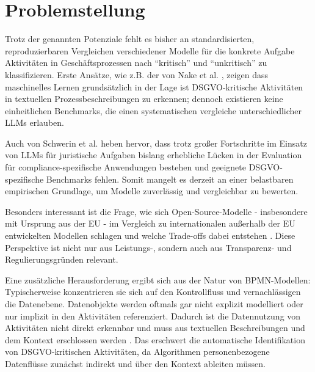 \section{Problemstellung}\label{sec:problemstellung}

Trotz der genannten Potenziale fehlt es bisher an standardisierten, reproduzierbaren Vergleichen verschiedener Modelle für die konkrete Aufgabe Aktivitäten in Geschäftsprozessen nach \enquote{kritisch} und \enquote{unkritisch} zu klassifizieren. Erste Ansätze, wie z.B. der von Nake et al. \cite{nake2023towards}, zeigen dass maschinelles Lernen grundsätzlich in der Lage ist \ac{DSGVO}-kritische Aktivitäten in textuellen Prozessbeschreibungen zu erkennen; dennoch existieren keine einheitlichen Benchmarks, die einen systematischen vergleiche unterschiedlicher \acp{LLM} erlauben.

Auch von Schwerin et al. \cite{schwerin2024systematic} heben hervor, dass trotz großer Fortschritte im Einsatz von \acp{LLM} für juristische Aufgaben bislang erhebliche Lücken in der Evaluation für compliance-spezifische Anwendungen bestehen und geeignete \ac{DSGVO}-spezifische Benchmarks fehlen. Somit mangelt es derzeit an einer belastbaren empirischen Grundlage, um Modelle zuverlässig und vergleichbar zu bewerten.

Besonders interessant ist die Frage, wie sich Open-Source-Modelle - insbesondere mit Ursprung aus der \ac{EU} - im Vergleich zu internationalen außerhalb der \ac{EU} entwickelten Modellen schlagen und welche Trade-offs dabei entstehen \cite{schwerin2024systematic}. Diese Perspektive ist nicht nur aus Leistungs-, sondern auch aus Transparenz- und Regulierungsgründen relevant.

Eine zusätzliche Herausforderung ergibt sich aus der Natur von \ac{BPMN}-Modellen: Typischerweise konzentrieren sie sich auf den Kontrollfluss und vernachlässigen die Datenebene. Datenobjekte werden oftmals gar nicht explizit modelliert oder nur implizit in den Aktivitäten referenziert. Dadurch ist die Datennutzung von Aktivitäten nicht direkt erkennbar und muss aus textuellen Beschreibungen und dem Kontext erschlossen werden \cite{schneid2021uncovering}. Das erschwert die automatische Identifikation von \ac{DSGVO}-kritischen Aktivitäten, da Algorithmen personenbezogene Datenflüsse zunächst indirekt und über den Kontext ableiten müssen.